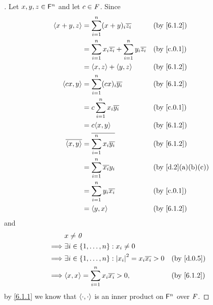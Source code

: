 \begin{proof}[]
  Let \(x, y, z \in \mathsf{F}^n\) and let \(c \in \mathit{F}\).
  Since
  \begin{align*}
    \inn{x + y, z}    & = \sum_{i = 1}^n (x + y)_i \conj{z_i}                           &  & \text{(by \cref{6.1.2})}        \\
                      & = \sum_{i = 1}^n x_i \conj{z_i} + \sum_{i = 1}^n y_i \conj{z_i} &  & \text{(by \cref{c.0.1})}        \\
                      & = \inn{x, z} + \inn{y, z}                                       &  & \text{(by \cref{6.1.2})}        \\
    \inn{cx, y}       & = \sum_{i = 1}^n (cx)_i \conj{y_i}                              &  & \text{(by \cref{6.1.2})}        \\
                      & = c \sum_{i = 1}^n x_i \conj{y_i}                               &  & \text{(by \cref{c.0.1})}        \\
                      & = c \inn{x, y}                                                  &  & \text{(by \cref{6.1.2})}        \\
    \conj{\inn{x, y}} & = \conj{\sum_{i = 1}^n x_i \conj{y_i}}                          &  & \text{(by \cref{6.1.2})}        \\
                      & = \sum_{i = 1}^n \conj{x_i} y_i                                 &  & \text{(by \cref{d.2}(a)(b)(c))} \\
                      & = \sum_{i = 1}^n y_i \conj{x_i}                                 &  & \text{(by \cref{c.0.1})}        \\
                      & = \inn{y, x}                                                    &  & \text{(by \cref{6.1.2})}
  \end{align*}
  and
  \begin{align*}
             & x \neq \zv                                                                                       \\
    \implies & \exists i \in \set{1, \dots, n} : x_i \neq 0                                                     \\
    \implies & \exists i \in \set{1, \dots, n} : \abs{x_i}^2 = x_i \conj{x_i} > 0 &  & \text{(by \cref{d.0.5})} \\
    \implies & \inn{x, x} = \sum_{i = 1}^n x_i \conj{x_i} > 0,                    &  & \text{(by \cref{6.1.2})}
  \end{align*}
  by \cref{6.1.1} we know that \(\left\langle\cdot, \cdot\right\rangle\) is an inner product on \(\mathsf{F}^n\) over \(\mathit{F}\).
\end{proof}

